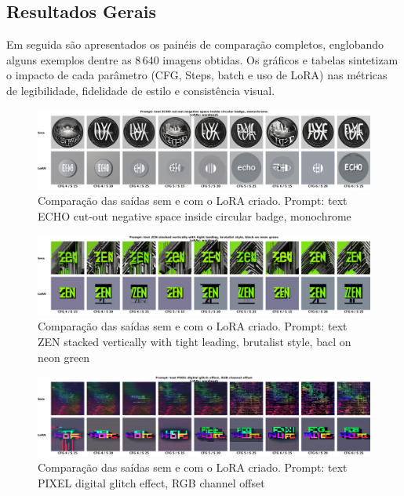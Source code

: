 \documentclass[12pt, %
openright, 
oneside, %
a4paper,    %
brazil]{facom-ufu-abntex2}
\begin{document}
\subsection{Resultados Gerais}

Em seguida são apresentados os painéis de comparação completos, englobando alguns exemplos dentre as 8\,640 imagens obtidas. Os gráficos e tabelas sintetizam o impacto de cada parâmetro (CFG, Steps, batch e uso de LoRA) nas métricas de legibilidade, fidelidade de estilo e consistência visual.

\begin{figure}[H]
    \centering
    \includegraphics[width=1.0\linewidth]{figuras/resultados/good/wordmark/p7_batch0.png}
    \caption[1º Comparação das saídas sem e com o LoRA criado.]{Comparação das saídas sem e com o LoRA criado. Prompt: text ECHO cut-out negative space inside circular badge, monochrome}
    \label{fig:wordmarkP7Batch0}
\end{figure}

\begin{figure}[H]
    \centering
    \includegraphics[width=1.0\linewidth]{figuras/resultados/good/wordmark/p5_batch1.png}
    \caption[2º Comparação das saídas sem e com o LoRA criado.]{Comparação das saídas sem e com o LoRA criado. Prompt: text ZEN stacked vertically with tight leading, brutalist style, bacl on neon green}
    \label{fig:wordmarkP5Batch1}
\end{figure}

\begin{figure}[H]
    \centering
    \includegraphics[width=1.0\linewidth]{figuras/resultados/good/wordmark/p18_batch0.png}
    \caption[3º Comparação das saídas sem e com o LoRA criado.]{Comparação das saídas sem e com o LoRA criado. Prompt: text PIXEL digital glitch effect, RGB channel offset}
    \label{fig:wordmarkP18Batch0}
\end{figure}
\end{document}
